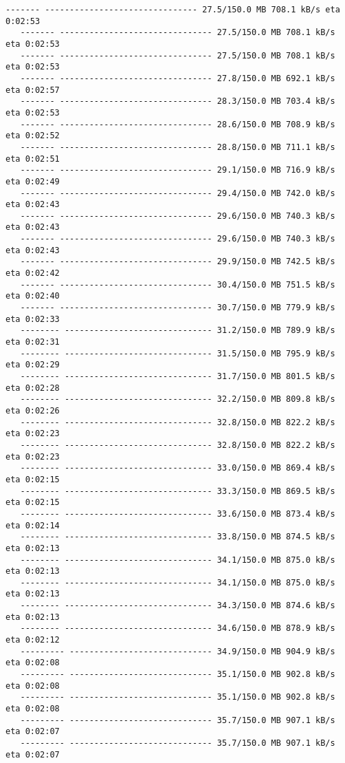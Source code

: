 \documentclass[11pt]{article}
\begin{document}
\begin{Verbatim}[commandchars=\\\{\}]
   ------- ------------------------------- 27.5/150.0 MB 708.1 kB/s eta 0:02:53
   ------- ------------------------------- 27.5/150.0 MB 708.1 kB/s eta 0:02:53
   ------- ------------------------------- 27.5/150.0 MB 708.1 kB/s eta 0:02:53
   ------- ------------------------------- 27.8/150.0 MB 692.1 kB/s eta 0:02:57
   ------- ------------------------------- 28.3/150.0 MB 703.4 kB/s eta 0:02:53
   ------- ------------------------------- 28.6/150.0 MB 708.9 kB/s eta 0:02:52
   ------- ------------------------------- 28.8/150.0 MB 711.1 kB/s eta 0:02:51
   ------- ------------------------------- 29.1/150.0 MB 716.9 kB/s eta 0:02:49
   ------- ------------------------------- 29.4/150.0 MB 742.0 kB/s eta 0:02:43
   ------- ------------------------------- 29.6/150.0 MB 740.3 kB/s eta 0:02:43
   ------- ------------------------------- 29.6/150.0 MB 740.3 kB/s eta 0:02:43
   ------- ------------------------------- 29.9/150.0 MB 742.5 kB/s eta 0:02:42
   ------- ------------------------------- 30.4/150.0 MB 751.5 kB/s eta 0:02:40
   ------- ------------------------------- 30.7/150.0 MB 779.9 kB/s eta 0:02:33
   -------- ------------------------------ 31.2/150.0 MB 789.9 kB/s eta 0:02:31
   -------- ------------------------------ 31.5/150.0 MB 795.9 kB/s eta 0:02:29
   -------- ------------------------------ 31.7/150.0 MB 801.5 kB/s eta 0:02:28
   -------- ------------------------------ 32.2/150.0 MB 809.8 kB/s eta 0:02:26
   -------- ------------------------------ 32.8/150.0 MB 822.2 kB/s eta 0:02:23
   -------- ------------------------------ 32.8/150.0 MB 822.2 kB/s eta 0:02:23
   -------- ------------------------------ 33.0/150.0 MB 869.4 kB/s eta 0:02:15
   -------- ------------------------------ 33.3/150.0 MB 869.5 kB/s eta 0:02:15
   -------- ------------------------------ 33.6/150.0 MB 873.4 kB/s eta 0:02:14
   -------- ------------------------------ 33.8/150.0 MB 874.5 kB/s eta 0:02:13
   -------- ------------------------------ 34.1/150.0 MB 875.0 kB/s eta 0:02:13
   -------- ------------------------------ 34.1/150.0 MB 875.0 kB/s eta 0:02:13
   -------- ------------------------------ 34.3/150.0 MB 874.6 kB/s eta 0:02:13
   -------- ------------------------------ 34.6/150.0 MB 878.9 kB/s eta 0:02:12
   --------- ----------------------------- 34.9/150.0 MB 904.9 kB/s eta 0:02:08
   --------- ----------------------------- 35.1/150.0 MB 902.8 kB/s eta 0:02:08
   --------- ----------------------------- 35.1/150.0 MB 902.8 kB/s eta 0:02:08
   --------- ----------------------------- 35.7/150.0 MB 907.1 kB/s eta 0:02:07
   --------- ----------------------------- 35.7/150.0 MB 907.1 kB/s eta 0:02:07

\end{Verbatim}
\end{document}
